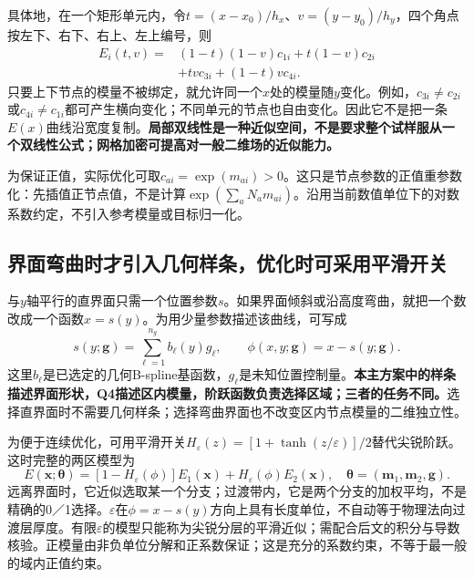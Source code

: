 \documentclass[11pt,a4paper]{ctexart}
\newcommand{\btheta}{\boldsymbol\theta}
\begin{document}
具体地，在一个矩形单元内，令$t=(x-x_0)/h_x$、$v=(y-y_0)/h_y$，四个角点按左下、右下、右上、左上编号，则
\begin{align}
 E_i(t,v)={}&(1-t)(1-v)c_{1i}+t(1-v)c_{2i}\nonumber\\
            &+tv c_{3i}+(1-t)v c_{4i}.
 \label{eq:q4_local}
\end{align}
只要上下节点的模量不被绑定，就允许同一个$x$处的模量随$y$变化。例如，$c_{3i}\ne c_{2i}$或$c_{4i}\ne c_{1i}$都可产生横向变化；不同单元的节点也自由变化。因此它不是把一条$E(x)$曲线沿宽度复制。\textbf{局部双线性是一种近似空间，不是要求整个试样服从一个双线性公式；网格加密可提高对一般二维场的近似能力。}

为保证正值，实际优化可取$c_{ai}=\exp(m_{ai})>0$。这只是节点参数的正值重参数化：先插值正节点值，不是计算$\exp(\sum_aN_am_{ai})$。沿用当前数值单位下的对数系数约定，不引入参考模量或目标归一化。

\subsection{界面弯曲时才引入几何样条，优化时可采用平滑开关}
\label{sec:geometry_role}
与$y$轴平行的直界面只需一个位置参数$s$。如果界面倾斜或沿高度弯曲，就把一个数改成一个函数$x=s(y)$。为用少量参数描述该曲线，可写成
\begin{equation}
 s(y;\mathbf g)=\sum_{\ell=1}^{n_g}b_\ell(y)g_\ell,\qquad
 \phi(x,y;\mathbf g)=x-s(y;\mathbf g).
 \label{eq:geometry}
\end{equation}
这里$b_\ell$是已选定的几何B-spline基函数，$g_\ell$是未知位置控制量。\textbf{本主方案中的样条描述界面形状，Q4描述区内模量，阶跃函数负责选择区域；三者的任务不同。}选择直界面时不需要几何样条；选择弯曲界面也不改变区内节点模量的二维独立性。

为便于连续优化，可用平滑开关$H_\varepsilon(z)=[1+\tanh(z/\varepsilon)]/2$替代尖锐阶跃。这时完整的两区模型为
\begin{equation}
 \boxed{E(\mathbf x;\btheta)=[1-H_\varepsilon(\phi)]E_1(\mathbf x)
       +H_\varepsilon(\phi)E_2(\mathbf x),\quad
       \btheta=(\mathbf m_1,\mathbf m_2,\mathbf g).}
 \label{eq:two}
\end{equation}
远离界面时，它近似选取某一个分支；过渡带内，它是两个分支的加权平均，不是精确的0／1选择。$\varepsilon$在$\phi=x-s(y)$方向上具有长度单位，不自动等于物理法向过渡层厚度。有限$\varepsilon$的模型只能称为尖锐分层的平滑近似；需配合后文的积分与导数核验。正模量由非负单位分解和正系数保证；这是充分的系数约束，不等于最一般的域内正值约束。
\end{document}
